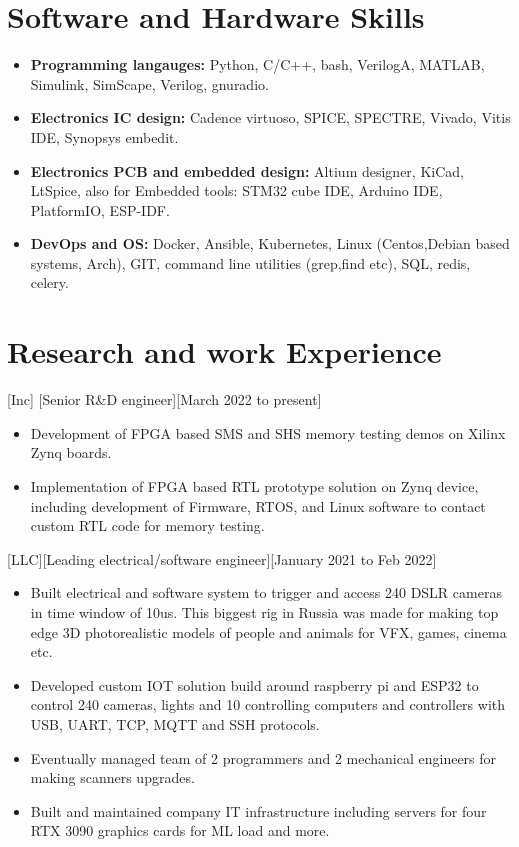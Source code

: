 \documentclass{article}
\begin{document}
\section{Software and Hardware Skills}
\begin{itemize}
\item \textbf{Programming langauges:} Python, C/C++, bash, VerilogA, MATLAB, Simulink, SimScape, Verilog, gnuradio. 
\item \textbf{Electronics IC design:} Cadence virtuoso, SPICE, SPECTRE, Vivado, Vitis IDE, Synopsys embedit.
\item \textbf{Electronics PCB and embedded design:} Altium designer, KiCad, LtSpice, also for Embedded tools: STM32 cube IDE, Arduino IDE, PlatformIO, ESP-IDF.
\item \textbf{DevOps and OS:} Docker, Ansible, Kubernetes, Linux (Centos,Debian based systems, Arch), GIT, command line utilities (grep,find etc), SQL, redis, celery.
\end{itemize}

\section{Research and work Experience}
 

 
[Inc]
[Senior R\&D engineer][March 2022 to present]
   \begin{itemize}
      \item Development of FPGA based SMS and SHS memory testing demos on Xilinx Zynq boards.
      \item Implementation of FPGA based RTL prototype solution on Zynq device, including development of Firmware, RTOS, and Linux software to contact custom RTL code for memory testing. 
   \end{itemize}

[LLC][Leading electrical/software engineer][January 2021 to Feb 2022]
\begin{itemize}
   \item Built electrical and software system to trigger and access 240 DSLR cameras in time window of 10us. This biggest rig in Russia was made for making top edge 3D photorealistic models of people and animals for VFX, games, cinema etc.
   \item Developed custom IOT solution build around raspberry pi and ESP32 to control 240 cameras, lights and 10 controlling computers and controllers with USB, UART, TCP, MQTT and SSH protocols.
   \item Eventually managed team of 2 programmers and 2 mechanical engineers for making scanners upgrades.
   \item Built and maintained company IT infrastructure including servers for four RTX 3090 graphics cards for ML load and more.
   \end{itemize}
\end{document}
